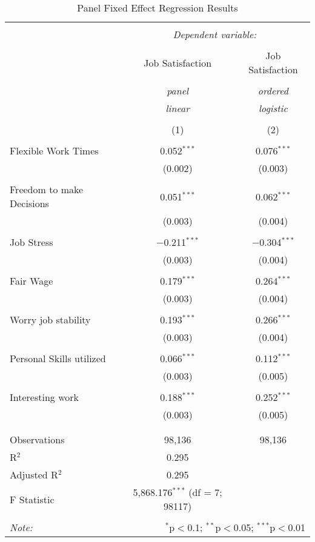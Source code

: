 
\begin{table}[!htbp] \centering 
  \caption{Panel Fixed Effect Regression Results} 
  \label{} 
\begin{tabular}{@{\extracolsep{3pt}}lcc} 
\\[-1.8ex]\hline 
\hline \\[-1.8ex] 
 & \multicolumn{2}{c}{\textit{Dependent variable:}} \\ 
\cline{2-3} 
\\[-1.8ex] & Job Satisfaction & Job Satisfaction \\ 
\\[-1.8ex] & \textit{panel} & \textit{ordered} \\ 
 & \textit{linear} & \textit{logistic} \\ 
\\[-1.8ex] & (1) & (2)\\ 
\hline \\[-1.8ex] 
 Flexible Work Times & 0.052$^{***}$ & 0.076$^{***}$ \\ 
  & (0.002) & (0.003) \\ 
  & & \\ 
 Freedom to make Decisions & 0.051$^{***}$ & 0.062$^{***}$ \\ 
  & (0.003) & (0.004) \\ 
  & & \\ 
 Job Stress & $-$0.211$^{***}$ & $-$0.304$^{***}$ \\ 
  & (0.003) & (0.004) \\ 
  & & \\ 
 Fair Wage & 0.179$^{***}$ & 0.264$^{***}$ \\ 
  & (0.003) & (0.004) \\ 
  & & \\ 
 Worry job stability & 0.193$^{***}$ & 0.266$^{***}$ \\ 
  & (0.003) & (0.004) \\ 
  & & \\ 
 Personal Skills utilized & 0.066$^{***}$ & 0.112$^{***}$ \\ 
  & (0.003) & (0.005) \\ 
  & & \\ 
 Interesting work & 0.188$^{***}$ & 0.252$^{***}$ \\ 
  & (0.003) & (0.005) \\ 
  & & \\ 
\hline \\[-1.8ex] 
Observations & 98,136 & 98,136 \\ 
R$^{2}$ & 0.295 &  \\ 
Adjusted R$^{2}$ & 0.295 &  \\ 
F Statistic & 5,868.176$^{***}$ (df = 7; 98117) &  \\ 
\hline 
\hline \\[-1.8ex] 
\textit{Note:}  & \multicolumn{2}{r}{$^{*}$p$<$0.1; $^{**}$p$<$0.05; $^{***}$p$<$0.01} \\ 
\end{tabular} 
\end{table} 
